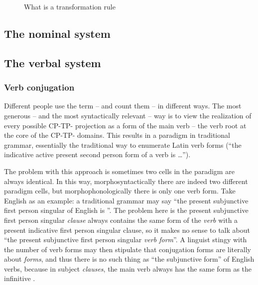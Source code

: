 {\begin{figure}[H]
    \caption{What is a transformation rule}
    \label{fig:transformation-rule}        
\end{figure}

\subsection{The nominal system}

\subsection{The verbal system}

\subsubsection{Verb conjugation}\label{sec:conjugation-form}

Different people use the term  -- and count them -- in different ways.
The most generous -- and the most syntactically relevant -- way 
is to view the realization of every possible CP-TP-\vP{} projection 
as a form of the main verb -- the verb root at the core of the CP-TP-\vP{} domains.
This results in a paradigm in traditional grammar, 
essentially the traditional way to enumerate Latin verb forms 
(``the indicative active present second person form of a verb is \dots'').

The problem with this approach is sometimes two cells in the paradigm are always identical.
In this way, morphosyntactically there are indeed two different paradigm cells,
but morphophonologically there is only one verb form.
Take English as an example: 
a traditional grammar may say 
``the present subjunctive first person singular of English  is ''. 
The problem here is the present subjunctive first person singular \emph{clause}
always contains the same form of the \emph{verb}
with a present indicative first person singular clause,
so it makes no sense to talk about ``the present subjunctive first person singular \emph{verb form}''.
A linguist stingy with the number of verb forms 
may then stipulate that conjugation forms are literally about \emph{forms},
and thus there is no such thing as ``the subjunctive form'' of English verbs,
because in subject \emph{clauses}, 
the main verb always has the same form as the infinitive
\citep[]{cgel}.

}
